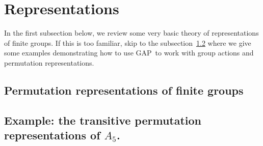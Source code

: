 \documentclass[11pt]{amsart}
\newcommand{\gap}{GAP}   %
\theoremstyle{plain}
\newcommand{\<}{\ensuremath{\langle}}
\renewcommand{\>}{\ensuremath{\rangle}}
\begin{document}
\section{Representations}
In the first subsection below, we review some very basic theory of representations of
finite groups.  If this is too familiar, skip to the
subsection~\ref{subsection-a5}
where we give some examples demonstrating how to use \gap\ to work with
group actions and permutation representations.
\subsection{Permutation representations of finite groups}

\subsection{Example:  the transitive permutation representations of $A_5$.}
\label{subsection-a5}


\vspace{5mm}
\end{document}

